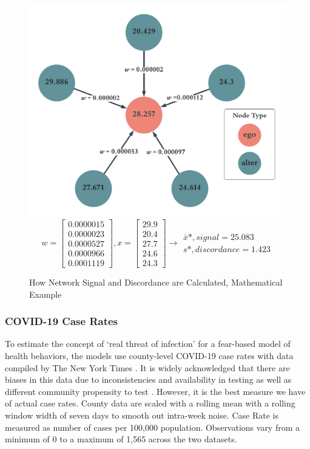 \begin{figure}
\begin{center}\includegraphics[width=0.5\linewidth,]{figs/paper3/discordancenetwork-1.pdf} 
  \begin{equation}
    w = \begin{bmatrix}0.0000015\\0.0000023\\0.0000527\\0.0000966\\0.0001119\end{bmatrix},  
    x = \begin{bmatrix}29.9\\20.4\\27.7\\24.6\\24.3\end{bmatrix} \longrightarrow
    \begin{matrix} \bar{x}*, signal = 25.083\\ s*, discordance = 1.423 \end{matrix} 
  \end{equation}
  \caption{How Network Signal and Discordance are Calculated, Mathematical Example}
  \label{fig:discordancenetwork}
  \end{center}
\end{figure}

\hypertarget{COVID-19-case-rates}{\subsubsection{COVID-19 Case Rates}\label{COVID-19-case-rates}}

To estimate the concept of `real threat of infection' for a fear-based model of
health behaviors, the models use county-level COVID-19 case rates with data
compiled by The New York Times \citeyearpar{covid_data}. It is widely
acknowledged that there are biases in this data due to inconsistencies and
availability in testing as well as different community propensity to test
\citep{gu22, cdc20a}. However, it is the best measure we have of actual case
rates. County data are scaled with a rolling mean with a rolling window width of
seven days to smooth out intra-week noise. Case Rate is measured as number of
cases per 100,000 population. Observations vary from a minimum of 0 to a maximum
of 1,565 across the two datasets.

